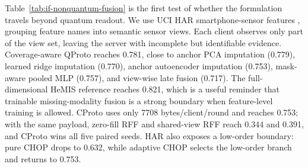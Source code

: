 \documentclass[preprint]{elsarticle}
\begin{document}

Table~\ref{tab:if-nonquantum-fusion} is the first test of whether the formulation travels beyond quantum readout. We use UCI HAR smartphone-sensor features \cite{anguita2013har}, grouping feature names into semantic sensor views. Each client observes only part of the view set, leaving the server with incomplete but identifiable evidence. Coverage-aware QProto reaches 0.781, close to anchor PCA imputation (0.779), learned ridge imputation (0.770), anchor autoencoder imputation (0.753), mask-aware pooled MLP (0.757), and view-wise late fusion (0.717). The full-dimensional HeMIS reference reaches 0.821, which is a useful reminder that trainable missing-modality fusion is a strong boundary when feature-level training is allowed. CProto uses only 7708 bytes/client/round and reaches 0.753; with the same payload, zero-fill RFF and shared-view RFF reach 0.344 and 0.391, and CProto wins all five paired seeds. HAR also exposes a low-order boundary: pure CHOP drops to 0.632, while adaptive CHOP selects the low-order branch and returns to 0.753.
\end{document}
